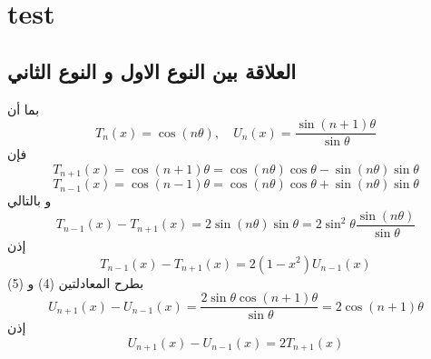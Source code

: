 \chapter{test}
\section{العلاقة بين النوع الاول و النوع الثاني}
بما أن 
\[
T_n(x) = \cos(n \theta), \quad U_n(x) = \frac{\sin(n+1)\theta}{\sin\theta}
\]
فإن
\[
T_{n+1}(x) = \cos(n+1)\theta = \cos(n\theta)\cos\theta - \sin(n\theta)\sin\theta 
\]
\[
T_{n-1}(x) = \cos(n-1)\theta = \cos(n\theta)\cos\theta + \sin(n\theta)\sin\theta 
\]
و بالتالي
\[
T_{n-1}(x) - T_{n+1}(x) = 2 \sin(n\theta) \sin\theta = 2 \sin^2\theta \frac{\sin(n\theta)}{\sin\theta} 
\]
إذن 
\begin{equation}
	T_{n-1}(x) - T_{n+1}(x) = 2 (1-x^2) U_{n-1}(x) 
\end{equation}
بطرح المعادلتين (4) و (5) 
\[
U_{n+1}(x) - U_{n-1}(x) = \frac{2\sin\theta\cos(n+1)\theta}{\sin\theta} = 2 \cos(n+1)\theta
\]
إذن 
\begin{equation}
	U_{n+1}(x) - U_{n-1}(x)  = 2T_{n+1}(x)
\end{equation}
